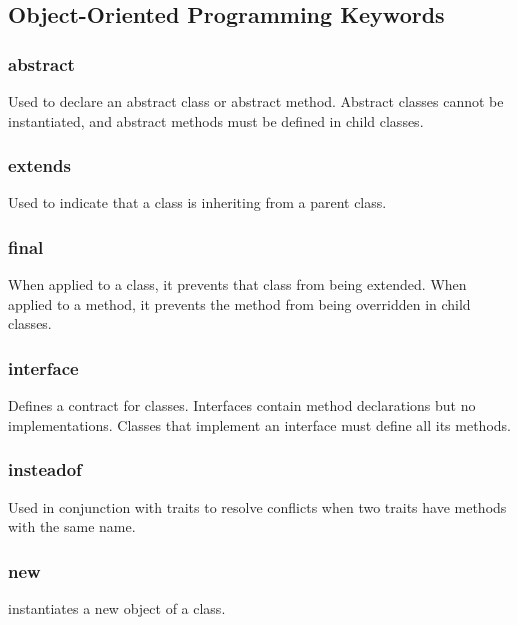 \documentclass{report}
\begin{document}
    \pagebreak 
    \subsection{Object-Oriented Programming Keywords}
    \bigbreak \noindent 
    \subsubsection{abstract}
    \bigbreak \noindent 
    Used to declare an abstract class or abstract method. Abstract classes cannot be instantiated, and abstract methods must be defined in child classes.

    \bigbreak \noindent 
    \subsubsection{extends}
    \bigbreak \noindent 
    Used to indicate that a class is inheriting from a parent class.

    \bigbreak \noindent 
    \subsubsection{final}
    \bigbreak \noindent 
    When applied to a class, it prevents that class from being extended. When applied to a method, it prevents the method from being overridden in child classes.

    \bigbreak \noindent 
    \subsubsection{interface}
    \bigbreak \noindent 
    Defines a contract for classes. Interfaces contain method declarations but no implementations. Classes that implement an interface must define all its methods.

    \bigbreak \noindent 
    \subsubsection{insteadof}
    \bigbreak \noindent 
    Used in conjunction with traits to resolve conflicts when two traits have methods with the same name.

    \bigbreak \noindent 
    \subsubsection{new}
    \bigbreak \noindent 
    instantiates a new object of a class.
\end{document}
